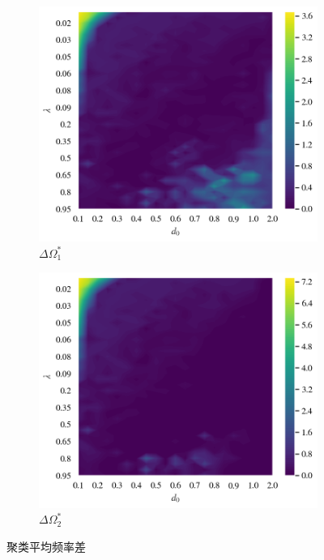 \documentclass{article}
\begin{document}
\begin{figure}[H]
	\centering
	\begin{subfigure}[b]{0.49\textwidth}
		\includegraphics[width=\textwidth]{./figs/clusterDeltaOmega1.png}
		\vspace{-1cm}
		\caption{$\Delta \Omega _{1}^{*}$}
	\end{subfigure}
	\begin{subfigure}[b]{0.49\textwidth}
		\includegraphics[width=\textwidth]{./figs/clusterDeltaOmega2.png}
		\vspace{-1cm}
		\caption{$\Delta \Omega _{2}^{*}$}
	\end{subfigure}
	\vspace{-0.5cm}
	\caption{聚类平均频率差}
	\label{fig:fig2.5.cluster}
\end{figure}
\end{document}
